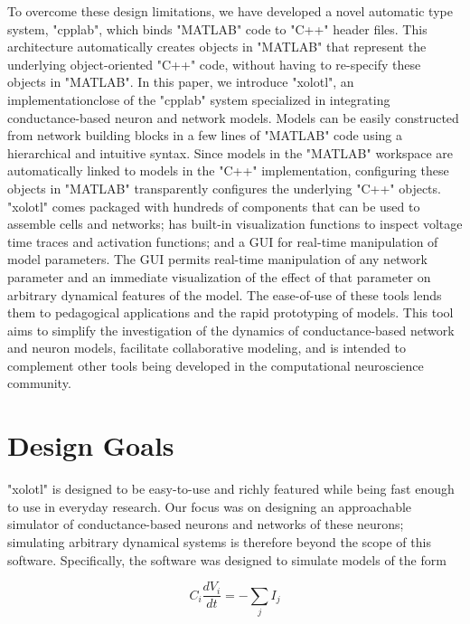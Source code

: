 \documentclass{frontiersSCNS} %
\begin{document}
To overcome these design limitations, we have developed a novel automatic type system, "cpplab", which binds "MATLAB" code to "C++" header files. This architecture automatically creates objects in "MATLAB" that represent the underlying object-oriented "C++" code, without having to re-specify these objects in "MATLAB". In this paper, we introduce "xolotl", an implementationclose of the "cpplab" system specialized in integrating conductance-based neuron and network models. Models can be easily constructed from network building blocks in a few lines of "MATLAB" code using a hierarchical and intuitive syntax. Since models in the "MATLAB" workspace are automatically linked to models in the "C++" implementation, configuring these objects in "MATLAB" transparently configures the underlying "C++" objects. "xolotl" comes packaged with hundreds of components that can be used to assemble cells and networks;  has built-in visualization functions to inspect voltage time traces and activation functions; and a GUI for real-time manipulation of model parameters. The GUI permits real-time manipulation of any network parameter and an immediate visualization of the effect of that parameter on arbitrary dynamical features of the model. The ease-of-use of these tools lends them to pedagogical applications and the rapid prototyping of models. This tool aims to simplify the investigation of the dynamics of conductance-based network and neuron models, facilitate collaborative modeling, and is intended to complement other tools being developed in the computational neuroscience community.


%
%
%
%
%
%

\section{Design Goals}
\label{design}

"xolotl" is designed to be easy-to-use and richly featured while being fast enough to use in everyday research. Our focus was on designing an approachable simulator of conductance-based neurons and networks of these neurons; simulating arbitrary dynamical systems is therefore beyond the scope of this software. Specifically, the software was designed to simulate models of the form 


\begin{equation}
C_{i}\frac{dV_{i}}{dt}=-\sum_{j}I_{j} \label{eq:1}
\end{equation}
\end{document}
